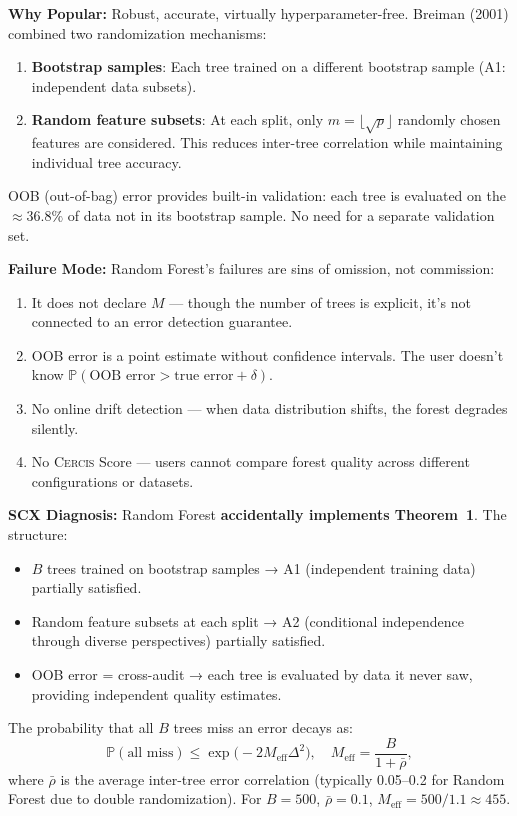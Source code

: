 \documentclass[12pt,a4paper]{article}
\theoremstyle{definition}
\newcommand{\Cercis}{\textsc{Cercis}}
\newcommand{\Pbb}{\mathbb{P}}
\newcommand{\whyPopular}{\noindent\textbf{Why Popular:} }
\newcommand{\whyFail}{\noindent\textbf{Failure Mode:} }
\newcommand{\diagnosis}{\noindent\textbf{SCX Diagnosis:} }
\begin{document}
\whyPopular{} Robust, accurate, virtually hyperparameter-free. Breiman (2001) combined two randomization mechanisms:
\begin{enumerate}[nosep]
    \item \textbf{Bootstrap samples}: Each tree trained on a different bootstrap sample (A1: independent data subsets).
    \item \textbf{Random feature subsets}: At each split, only $m = \lfloor\sqrt{p}\rfloor$ randomly chosen features are considered. This reduces inter-tree correlation while maintaining individual tree accuracy.
\end{enumerate}
OOB (out-of-bag) error provides built-in validation: each tree is evaluated on the $\approx 36.8\%$ of data not in its bootstrap sample. No need for a separate validation set.

\whyFail{} Random Forest's failures are sins of omission, not commission:
\begin{enumerate}[nosep]
    \item It does not declare $M$ — though the number of trees is explicit, it's not connected to an error detection guarantee.
    \item OOB error is a point estimate without confidence intervals. The user doesn't know $\Pbb(\text{OOB error} > \text{true error} + \delta)$.
    \item No online drift detection — when data distribution shifts, the forest degrades silently.
    \item No \Cercis{} Score — users cannot compare forest quality across different configurations or datasets.
\end{enumerate}

\diagnosis{} Random Forest \textbf{accidentally implements Theorem~1}. The structure:
\begin{itemize}[nosep]
    \item $B$ trees trained on bootstrap samples → A1 (independent training data) partially satisfied.
    \item Random feature subsets at each split → A2 (conditional independence through diverse perspectives) partially satisfied.
    \item OOB error = cross-audit → each tree is evaluated by data it never saw, providing independent quality estimates.
\end{itemize}
The probability that all $B$ trees miss an error decays as:
\[
\Pbb(\text{all miss}) \le \exp\bigl(-2M_{\text{eff}}\Delta^2\bigr), \quad M_{\text{eff}} = \frac{B}{1 + \bar{\rho}},
\]
where $\bar{\rho}$ is the average inter-tree error correlation (typically 0.05--0.2 for Random Forest due to double randomization). For $B=500$, $\bar{\rho}=0.1$, $M_{\text{eff}} = 500/1.1 \approx 455$.
\end{document}
